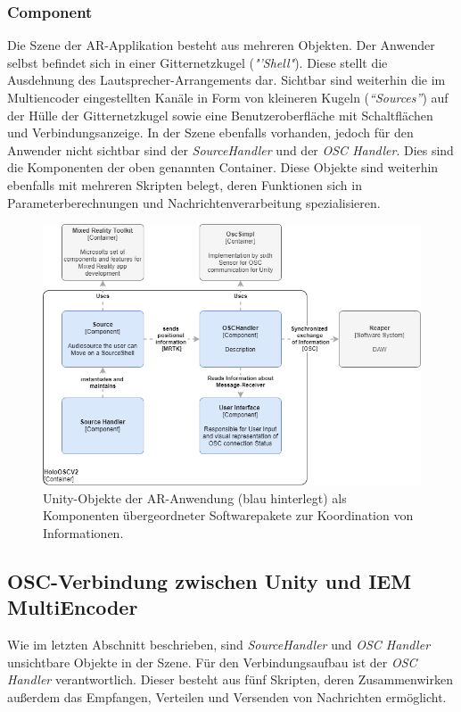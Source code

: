 \documentclass[11pt, titlepage, fleqn]{report}
\begin{document}
                \subsubsection*{Component}
                    Die Szene der AR-Applikation besteht aus mehreren Objekten. Der Anwender selbst befindet sich in einer 
                    Gitternetzkugel (\textit{"'Shell"}). Diese stellt die 
                    Ausdehnung des Lautsprecher-Arrangements dar. Sichtbar sind 
                    weiterhin 
                    die im Multiencoder eingestellten Kanäle in Form von 
                    kleineren Kugeln (\textit{“Sources”}) auf der Hülle der 
                    Gitternetzkugel 
                    sowie eine Benutzeroberfläche mit Schaltflächen und Verbindungsanzeige. In der Szene ebenfalls vorhanden, jedoch 
                    für den Anwender nicht sichtbar sind der 
                    \textit{SourceHandler} und der \textit{OSC Handler}.
                    Dies sind die Komponenten der oben genannten Container. Diese Objekte sind weiterhin ebenfalls mit mehreren Skripten 
                    belegt, deren Funktionen sich in Parameterberechnungen und Nachrichtenverarbeitung spezialisieren. 
                    \begin{figure}[H]
                        \centering
                        \includegraphics[width=\linewidth]{./img/C4_Components.png}
                        \caption[C4 Modell - Componenten]{Unity-Objekte der AR-Anwendung (blau hinterlegt) als Komponenten übergeordneter Softwarepakete zur Koordination von Informationen.\label{fig:container}}
                    \end{figure}\newpage
            \subsection{OSC-Verbindung zwischen Unity und IEM MultiEncoder}
            \label{sec:3.2.2}
                Wie im letzten Abschnitt beschrieben, sind \textit{SourceHandler} und \textit{OSC Handler} unsichtbare Objekte in der Szene. 
                Für den Verbindungsaufbau ist der \textit{OSC Handler} 
                verantwortlich. Dieser besteht aus fünf Skripten, deren 
                Zusammenwirken 
                außerdem das Empfangen, Verteilen und Versenden von Nachrichten ermöglicht. 
\end{document}

